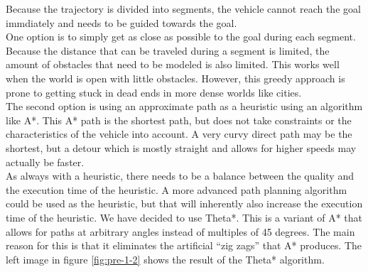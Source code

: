 Because the trajectory is divided into segments, the vehicle cannot reach the goal immdiately and needs to be guided towards the goal.\\
One option is to simply get as close as possible to the goal during each segment. Because the distance that can be traveled during a segment is limited, the amount of obstacles that need to be modeled is also limited. This works well when the world is open with little obstacles. However, this greedy approach is prone to getting stuck in dead ends in more dense worlds like cities.
\\
The second option is using an approximate path as a heuristic using an algorithm like A*. This A* path is the shortest path, but does not take constraints or the characteristics of the vehicle into account. A very curvy direct path may be the shortest, but a detour which is mostly straight and allows for higher speeds may actually be faster. 
\\
As always with a heuristic, there needs to be a balance between the quality and the execution time of the heuristic. A more advanced path planning algorithm could be used as the heuristic, but that will inherently also increase the execution time of the heuristic. We have decided to use Theta*. This is a variant  of A* that allows for paths at arbitrary angles instead of multiples of 45 degrees. The main reason for this is that it eliminates the artificial ``zig zags'' that A* produces. The left image in figure \ref{fig:pre-1-2} shows the result of the Theta* algorithm.\\


